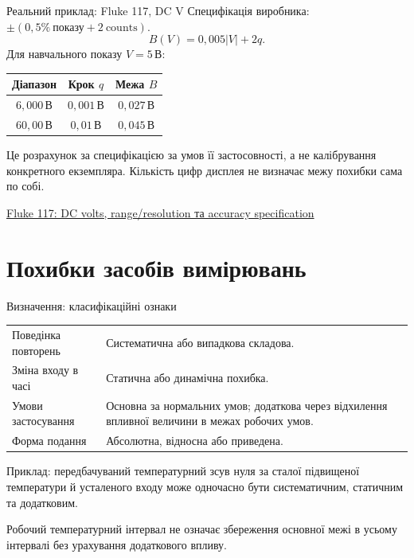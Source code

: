 \documentclass[aspectratio=169,11pt]{beamer}
\newcommand{\unit}[1]{\,\text{#1}}
\newcommand{\src}[2]{\par\vfill{\tiny\href{#1}{#2}}}
\begin{document}
\begin{frame}{Реальний приклад: Fluke 117, DC V}
Специфікація виробника: $\pm(0{,}5\%\ \text{показу}+2\ \text{counts})$.
\[
B(V)=0{,}005|V|+2q.
\]
Для навчального показу $V=5\unit{В}$:
\begin{center}
\begin{tabular}{ccc}
\toprule
Діапазон & Крок $q$ & Межа $B$\\\midrule
$6{,}000\unit{В}$ & $0{,}001\unit{В}$ & $0{,}027\unit{В}$\\
$60{,}00\unit{В}$ & $0{,}01\unit{В}$ & $0{,}045\unit{В}$\\\bottomrule
\end{tabular}
\end{center}
Це розрахунок за специфікацією за умов її застосовності, а не калібрування конкретного екземпляра. Кількість цифр дисплея не визначає межу похибки сама по собі.
\src{https://www.fluke.com/en-us/product/electrical-testing/digital-multimeters/fluke-117}{Fluke 117: DC volts, range/resolution та accuracy specification}
\end{frame}

\section{Похибки засобів вимірювань}
\begin{frame}{Визначення: класифікаційні ознаки}
\small
\begin{tabular}{>{\raggedright\arraybackslash}p{}>{\raggedright\arraybackslash}p{}}
\toprule
Поведінка повторень & Систематична або випадкова складова.\\[2mm]
Зміна входу в часі & Статична або динамічна похибка.\\[2mm]
Умови застосування & Основна за нормальних умов; додаткова через відхилення впливної величини в межах робочих умов.\\[2mm]
Форма подання & Абсолютна, відносна або приведена.\\\bottomrule
\end{tabular}
\medskip

\normalsize
Приклад: передбачуваний температурний зсув нуля за сталої підвищеної температури й усталеного входу може одночасно бути систематичним, статичним та додатковим.
\medskip

Робочий температурний інтервал не означає збереження основної межі в усьому інтервалі без урахування додаткового впливу.
\end{frame}
\end{document}
